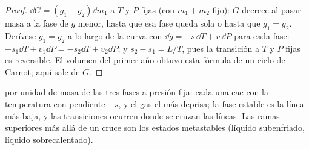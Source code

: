 \begin{proof}
$\dd G = (g_1 - g_2)\dd m_1$ a $T$ y $P$ fijas (con $m_1 + m_2$ fijo):
$G$ decrece al pasar masa a la fase de $g$ menor, hasta que esa
fase queda sola o hasta que $g_1 = g_2$. Derívese $g_1 = g_2$ a lo largo de la
curva con $\dd g = -s\,\dd T + v\,\dd P$ para cada fase: $-s_1\dd T +
v_1\dd P = -s_2\dd T + v_2\dd P$; y $s_2 - s_1 = L/T$, pues la transición
a $T$ y $P$ fijas es reversible. El volumen del primer año obtuvo esta fórmula
de un ciclo de Carnot; aquí sale de $G$.
\end{proof}

\begin{omfigure}

{\small {} por unidad de masa de las tres fases a presión
fija: cada una cae con la temperatura con pendiente $-s$, y el gas el
más deprisa; la fase estable es la línea más baja, y las transiciones ocurren
donde se cruzan las líneas. Las ramas superiores más allá de un cruce son los
estados metastables (líquido subenfriado, líquido sobrecalentado).}
\end{omfigure}

